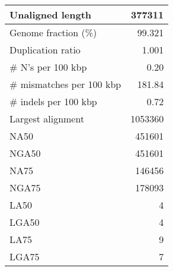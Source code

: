 \documentclass[12pt,a4paper]{article}
\begin{document}
\begin{table}[ht]
\begin{center}
\begin{tabular}{|l*{1}{|r}|}
Unaligned length & 377311 \\ \hline
Genome fraction (\%) & 99.321 \\ \hline
Duplication ratio & 1.001 \\ \hline
\# N's per 100 kbp & 0.20 \\ \hline
\# mismatches per 100 kbp & 181.84 \\ \hline
\# indels per 100 kbp & 0.72 \\ \hline
Largest alignment & 1053360 \\ \hline
NA50 & 451601 \\ \hline
NGA50 & 451601 \\ \hline
NA75 & 146456 \\ \hline
NGA75 & 178093 \\ \hline
LA50 & 4 \\ \hline
LGA50 & 4 \\ \hline
LA75 & 9 \\ \hline
LGA75 & 7 \\ \hline
\end{tabular}
\end{center}
\end{table}
\end{document}
